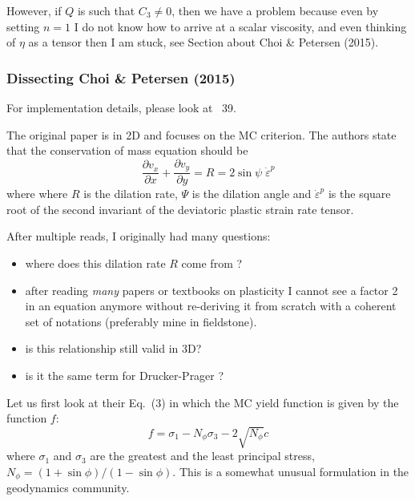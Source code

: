 However, if $Q$ is such that $C_3\neq 0$, then we have a problem because 
even by setting $n=1$ I do not know how to arrive at a scalar viscosity, 
and even thinking of $\eta$ as a tensor then I am stuck, see Section about 
Choi \& Petersen (2015).





\newpage
\subsubsection{Dissecting Choi \& Petersen (2015)}

For implementation details, please look at \stone~39. 

The original paper \cite{chpe15} is in 2D and focuses on the MC criterion. 
The authors state that the conservation of mass equation 
should be 
\[
\frac{\partial v_x}{\partial x}
+
\frac{\partial v_y}{\partial y}
=
R=2 \sin \psi \; \dot{\varepsilon}^p
\]
where where $R$ is the dilation rate, $\Psi$ is the dilation angle and
$\dot{\varepsilon}^p$ is the square root of the second invariant of the deviatoric plastic strain rate tensor.

After multiple reads, I originally had many questions:
\begin{itemize}
\item where does this dilation rate $R$ come from ? 
\item after reading \textit{many} papers or textbooks on plasticity 
I cannot see a factor 2 in an equation anymore without re-deriving 
it from scratch with a coherent set of notations (preferably mine in fieldstone). 
\item is this relationship still valid in 3D?
\item is it the same term for Drucker-Prager ?
\end{itemize}

\vspace{1cm}

Let us first look at their Eq.~(3)  in which  
the MC yield function is given by the function $f$:
\[
f = \sigma_1 - N_\phi \sigma_3 - 2 \sqrt{N_\phi} c 
\]
where $\sigma_1$ and $\sigma_3$ are the greatest and the least principal stress, $N_\phi=(1+\sin \phi)/(1-\sin \phi)$.
This is a somewhat unusual formulation in the geodynamics community.

